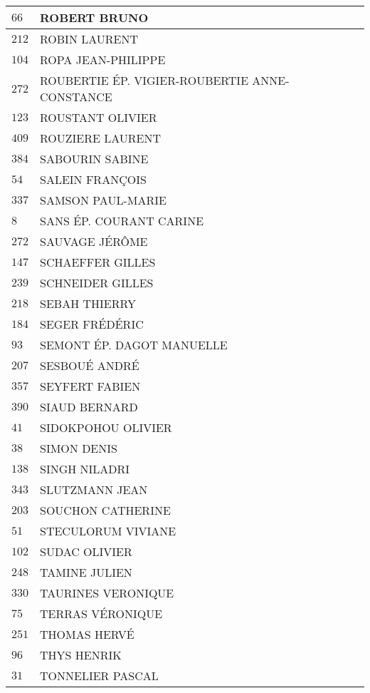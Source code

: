 \begin{xltabular}{\linewidth}{|l|X|}
    \hline
    $66$ & ROBERT BRUNO \\
    \hline
    $212$ & ROBIN LAURENT \\
    \hline
    $104$ & ROPA JEAN-PHILIPPE \\
    \hline
    $272$ & ROUBERTIE ÉP. VIGIER-ROUBERTIE ANNE-CONSTANCE \\
    \hline
    $123$ & ROUSTANT OLIVIER \\
    \hline
    $409$ & ROUZIERE LAURENT \\
    \hline
    $384$ & SABOURIN SABINE \\
    \hline
    $54$ & SALEIN FRANÇOIS \\
    \hline
    $337$ & SAMSON PAUL-MARIE \\
    \hline
    $8$ & SANS ÉP. COURANT CARINE \\
    \hline
    $272$ & SAUVAGE JÉRÔME \\
    \hline
    $147$ & SCHAEFFER GILLES \\
    \hline
    $239$ & SCHNEIDER GILLES \\
    \hline
    $218$ & SEBAH THIERRY \\
    \hline
    $184$ & SEGER FRÉDÉRIC \\
    \hline
    $93$ & SEMONT ÉP. DAGOT MANUELLE \\
    \hline
    $207$ & SESBOUÉ ANDRÉ \\
    \hline
    $357$ & SEYFERT FABIEN \\
    \hline
    $390$ & SIAUD BERNARD \\
    \hline
    $41$ & SIDOKPOHOU OLIVIER \\
    \hline
    $38$ & SIMON DENIS \\
    \hline
    $138$ & SINGH NILADRI \\
    \hline
    $343$ & SLUTZMANN JEAN \\
    \hline
    $203$ & SOUCHON CATHERINE \\
    \hline
    $51$ & STECULORUM VIVIANE \\
    \hline
    $102$ & SUDAC OLIVIER \\
    \hline
    $248$ & TAMINE JULIEN \\
    \hline
    $330$ & TAURINES VERONIQUE \\
    \hline
    $75$ & TERRAS VÉRONIQUE \\
    \hline
    $251$ & THOMAS HERVÉ \\
    \hline
    $96$ & THYS HENRIK \\
    \hline
    $31$ & TONNELIER PASCAL \\

\end{xltabular}
